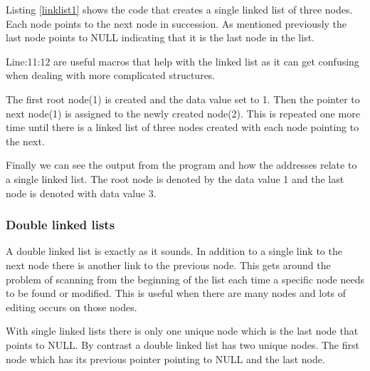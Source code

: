 Listing \ref{linklist1} shows the code that creates a single linked list of three nodes. Each node points to the next node in succession. As mentioned previously the last node points to NULL indicating that it is the last node in the list. 

Line:11:12 are useful macros that help with the linked list as it can get confusing when dealing with more complicated structures.

The first root node(1) is created and the data value set to 1. Then the pointer to next node(1) is assigned to the newly created node(2). This is repeated one more time until there is a linked list of three nodes created with each node pointing to the next.  

Finally we can see the output from the program and how the addresses relate to a single linked list. The root node is denoted by the data value 1 and the last node is denoted with data value 3.

\subsubsection{Double linked lists}

A double linked list is exactly as it sounds. In addition to a single link to the next node there is another link to the previous node. This gets around the problem of scanning from the beginning of the list each time a specific node needs to be found or modified. This is useful when there are many nodes and lots of editing occurs on those nodes. 

With single linked lists there is only one unique node which is the last node that points to NULL. By contrast a double linked list has two unique nodes. The first node which has its previous pointer pointing to NULL and the last node.


